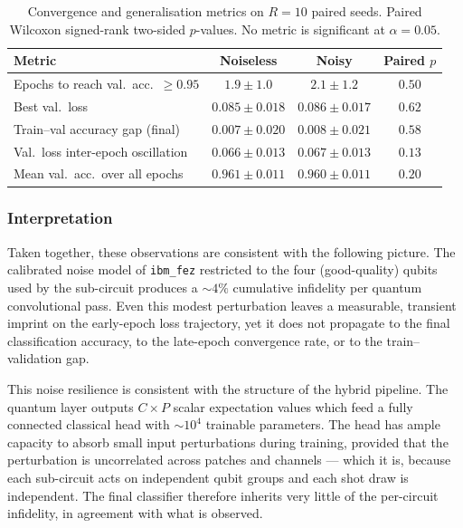 \begin{table}[tb]
  \centering
  \small
  \begin{tabular}{lccc}
    \toprule
    Metric & Noiseless & Noisy & Paired $p$ \\
    \midrule
    Epochs to reach val.\ acc.\ $\geq 0.95$
      & $1.9 \pm 1.0$ & $2.1 \pm 1.2$ & $0.50$ \\
    Best val.\ loss
      & $0.085 \pm 0.018$ & $0.086 \pm 0.017$ & $0.62$ \\
    Train--val accuracy gap (final)
      & $0.007 \pm 0.020$ & $0.008 \pm 0.021$ & $0.58$ \\
    Val.\ loss inter-epoch oscillation
      & $0.066 \pm 0.013$ & $0.067 \pm 0.013$ & $0.13$ \\
    Mean val.\ acc.\ over all epochs
      & $0.961 \pm 0.011$ & $0.960 \pm 0.011$ & $0.20$ \\
    \bottomrule
  \end{tabular}
  \caption{Convergence and generalisation metrics on $R=10$ paired seeds. Paired Wilcoxon signed-rank two-sided $p$-values. No metric is significant at $\alpha=0.05$.}
  \label{tab:noise_metrics}
\end{table}

\subsubsection{Interpretation}
\label{subsec:noise_interpretation}

Taken together, these observations are consistent with the following picture. The calibrated noise model of \texttt{ibm\_fez} restricted to the four (good-quality) qubits used by the sub-circuit produces a $\sim 4\%$ cumulative infidelity per quantum convolutional pass. Even this modest perturbation leaves a measurable, transient imprint on the early-epoch loss trajectory, yet it does not propagate to the final classification accuracy, to the late-epoch convergence rate, or to the train--validation gap.

This noise resilience is consistent with the structure of the hybrid pipeline. The quantum layer outputs $C \times P$ scalar expectation values which feed a fully connected classical head with $\sim 10^{4}$ trainable parameters. The head has ample capacity to absorb small input perturbations during training, provided that the perturbation is uncorrelated across patches and channels --- which it is, because each sub-circuit acts on independent qubit groups and each shot draw is independent. The final classifier therefore inherits very little of the per-circuit infidelity, in agreement with what is observed.

